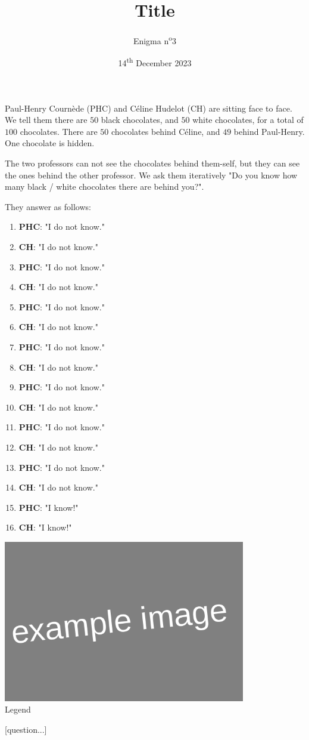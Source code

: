 \documentclass[a4paper, top=10mm]{article}
\title{\textbf{\huge{Title}}}
\author{Enigma n\textsuperscript{o}3}
\date{14\textsuperscript{th} December 2023}
\begin{document}
	\maketitle
	
	Paul-Henry Cournède (PHC) and Céline Hudelot (CH) are sitting face to face.
	We tell them there are $50$ black chocolates, and $50$ white chocolates, for a total of $100$ chocolates.
	There are $50$ chocolates behind Céline, and $49$ behind Paul-Henry.
	One chocolate is hidden.
	
	The two professors can not see the chocolates behind them-self, but they can see the ones behind the other professor.
	We ask them iteratively "Do you know how many black / white chocolates there are behind you?".
	
	They answer as follows:
	
	\begin{enumerate}
		\item \textbf{PHC}: "I do not know."
		\item \textbf{CH}: "I do not know."
		\item \textbf{PHC}: "I do not know."
		\item \textbf{CH}: "I do not know."
		\item \textbf{PHC}: "I do not know."
		\item \textbf{CH}: "I do not know."
		\item \textbf{PHC}: "I do not know."
		\item \textbf{CH}: "I do not know."
		\item \textbf{PHC}: "I do not know."
		\item \textbf{CH}: "I do not know."
		\item \textbf{PHC}: "I do not know."
		\item \textbf{CH}: "I do not know."
		\item \textbf{PHC}: "I do not know."
		\item \textbf{CH}: "I do not know."
		\item \textbf{PHC}: "I know!"
		\item \textbf{CH}: "I know!"
	\end{enumerate}
	
	\begin{center}
		\includegraphics[height=200pt]{00example.png}\\
		Legend
	\end{center}
	
	[question...]
	
\end{document}
